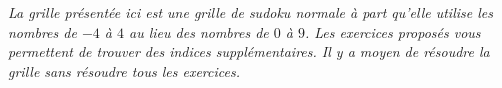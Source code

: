 
\begin{exercice}\label{exosmath-0490}


\newpage

\begin{center}
    \emph{La grille présentée ici est une grille de sudoku normale à part qu'elle utilise les nombres de \( -4\) à \( 4\) au lieu des nombres de \( 0\) à \( 9\). Les exercices proposés vous permettent de trouver des indices supplémentaires. Il y a moyen de résoudre la grille sans résoudre tous les exercices.}
\end{center}

\begin{multicols}{2}

    \begin{minipage}{7cm}
        
    \end{minipage}

    \vspace{1cm}


\end{multicols}
\end{exercice}
